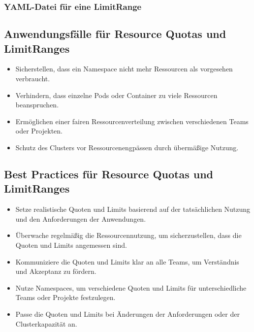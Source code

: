 \newpage
\subsubsection{YAML-Datei für eine LimitRange}


\subsection{Anwendungsfälle für Resource Quotas und LimitRanges}
\begin{itemize}
    \item Sicherstellen, dass ein Namespace nicht mehr Ressourcen als vorgesehen verbraucht.
    \item Verhindern, dass einzelne Pods oder Container zu viele Ressourcen beanspruchen.
    \item Ermöglichen einer fairen Ressourcenverteilung zwischen verschiedenen Teams oder Projekten.
    \item Schutz des Clusters vor Ressourcenengpässen durch übermäßige Nutzung.
\end{itemize}

\subsection{Best Practices für Resource Quotas und LimitRanges}
\begin{itemize}
    \item Setze realistische Quoten und Limits basierend auf der tatsächlichen Nutzung und den Anforderungen der Anwendungen.
    \item Überwache regelmäßig die Ressourcennutzung, um sicherzustellen, dass die Quoten und Limits angemessen sind.
    \item Kommuniziere die Quoten und Limits klar an alle Teams, um Verständnis und Akzeptanz zu fördern.
    \item Nutze Namespaces, um verschiedene Quoten und Limits für unterschiedliche Teams oder Projekte festzulegen.
    \item Passe die Quoten und Limits bei Änderungen der Anforderungen oder der Clusterkapazität an.
\end{itemize}


